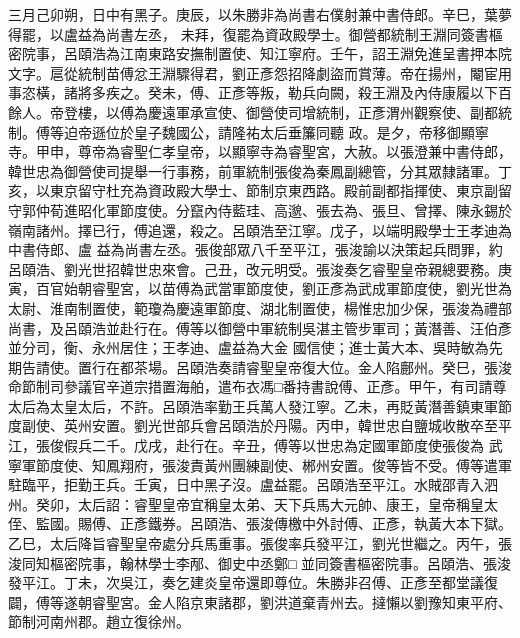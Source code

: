 \begin{pinyinscope}
 三月己卯朔，日中有黑子。庚辰，以朱勝非為尚書右僕射兼中書侍郎。辛巳，葉夢得罷，以盧益為尚書左丞，
 未拜，復罷為資政殿學士。御營都統制王淵同簽書樞密院事，呂頤浩為江南東路安撫制置使、知江寧府。壬午，詔王淵免進呈書押本院文字。扈從統制苗傅忿王淵驟得君，劉正彥怨招降劇盜而賞薄。帝在揚州，閹宦用事恣橫，諸將多疾之。癸未，傅、正彥等叛，勒兵向闕，殺王淵及內侍康履以下百餘人。帝登樓，以傅為慶遠軍承宣使、御營使司增統制，正彥渭州觀察使、副都統制。傅等迫帝遜位於皇子魏國公，請隆祐太后垂簾同聽
 政。是夕，帝移御顯寧寺。甲申，尊帝為睿聖仁孝皇帝，以顯寧寺為睿聖宮，大赦。以張澄兼中書侍郎，韓世忠為御營使司提舉一行事務，前軍統制張俊為秦鳳副總管，分其眾隸諸軍。丁亥，以東京留守杜充為資政殿大學士、節制京東西路。殿前副都指揮使、東京副留守郭仲荀進昭化軍節度使。分竄內侍藍珪、高邈、張去為、張旦、曾擇、陳永錫於嶺南諸州。擇已行，傅追還，殺之。呂頤浩至江寧。戊子，以端明殿學士王孝迪為中書侍郎、盧
 益為尚書左丞。張俊部眾八千至平江，張浚諭以決策起兵問罪，約呂頤浩、劉光世招韓世忠來會。己丑，改元明受。張浚奏乞睿聖皇帝親總要務。庚寅，百官始朝睿聖宮，以苗傅為武當軍節度使，劉正彥為武成軍節度使，劉光世為太尉、淮南制置使，範瓊為慶遠軍節度、湖北制置使，楊惟忠加少保，張浚為禮部尚書，及呂頤浩並赴行在。傅等以御營中軍統制吳湛主管步軍司；黃潛善、汪伯彥並分司，衡、永州居住；王孝迪、盧益為大金
 國信使；進士黃大本、吳時敏為先期告請使。置行在都茶場。呂頤浩奏請睿聖皇帝復大位。金人陷鄜州。癸巳，張浚命節制司參議官辛道宗措置海舶，遣布衣馮□番持書說傅、正彥。甲午，有司請尊太后為太皇太后，不許。呂頤浩率勤王兵萬人發江寧。乙未，再貶黃潛善鎮東軍節度副使、英州安置。劉光世部兵會呂頤浩於丹陽。丙申，韓世忠自鹽城收散卒至平江，張俊假兵二千。戊戌，赴行在。辛丑，傅等以世忠為定國軍節度使張俊為
 武寧軍節度使、知鳳翔府，張浚責黃州團練副使、郴州安置。俊等皆不受。傅等遣軍駐臨平，拒勤王兵。壬寅，日中黑子沒。盧益罷。呂頤浩至平江。水賊邵青入泗州。癸卯，太后詔：睿聖皇帝宜稱皇太弟、天下兵馬大元帥、康王，皇帝稱皇太侄、監國。賜傅、正彥鐵券。呂頤浩、張浚傳檄中外討傅、正彥，執黃大本下獄。乙巳，太后降旨睿聖皇帝處分兵馬重事。張俊率兵發平江，劉光世繼之。丙午，張浚同知樞密院事，翰林學士李邴、御史中丞鄭□
 並同簽書樞密院事。呂頤浩、張浚發平江。丁未，次吳江，奏乞建炎皇帝還即尊位。朱勝非召傅、正彥至都堂議復闢，傅等遂朝睿聖宮。金人陷京東諸郡，劉洪道棄青州去。撻懶以劉豫知東平府、節制河南州郡。趙立復徐州。




\end{pinyinscope}

